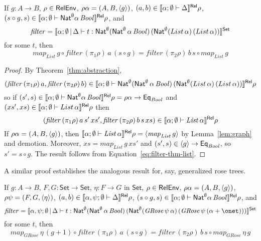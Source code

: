 \documentclass[runningheads]{llncs}
\newcommand{\set}{\mathsf{Set}}
\newcommand{\semmap}{\mathit{map}}
\newcommand{\filtype}{\Nat^\emptyset 
 (\Nat^\emptyset \, \alpha \, \mathit{Bool})\, (\Nat^\emptyset 
  (List \, \alpha) \, (List \, \alpha))}
\newcommand{\filtypeGRose}{\Nat^\emptyset 
 (\Nat^\emptyset \, \alpha \, \mathit{Bool})\, (\Nat^\emptyset 
  (\mathit{GRose}\,\psi \, \alpha) \, (\mathit{GRose}\,\psi \, (\alpha
  + \onet)))}
\begin{document}
\begin{theorem} 
If $g : A \to B$, $\rho \in \mathsf{RelEnv}$, $\rho \alpha = (A, B, \langle {g} \rangle)$,
$(a, b) \in \llbracket{\alpha ;\emptyset \vdash \Delta}\rrbracket^{\mathsf{Rel}} \rho$, $(s \circ
g, s) \in \llbracket{\alpha; \emptyset \vdash \mathsf{Nat}^\emptyset \alpha \,
  \mathit{Bool}}\rrbracket^{\mathsf{Rel}} \rho$, and
\[\mathit{filter} = \setsem{\alpha; \emptyset \,|\, \Delta \vdash t :
  \filtype}\]
\noindent
for some $t$, then
\[  \mathit{map}_{\mathit{List}} \,g \circ \mathit{filter} \, (\pi_1
\rho) \, a \, (s \circ g) = \mathit{filter}\, (\pi_2\rho) \, b \, s
\circ \mathit{map}_{\mathit{List}} \,g\]
\end{theorem}
\begin{proof}
By Theorem~\ref{thm:abstraction}, \[(\mathit{filter}\, (\pi_1 \rho)\,
a, \mathit{filter}\, (\pi_2 \rho)\, b) \in \relsem{\alpha; \emptyset
  \vdash \filtype} \rho\] so if $(s', s) \in \llbracket{\alpha; \emptyset
  \vdash \mathsf{Nat}^\emptyset \alpha \, \mathit{Bool}}\rrbracket^{\mathsf{Rel}} \rho = \rho\alpha \to
\mathsf{Eq}_{\mathit{Bool}}$ and $(xs', xs) \in \llbracket{\alpha; \emptyset
  \vdash List \, \alpha}\rrbracket^{\mathsf{Rel}} \rho$ then
\begin{equation}\label{eq:filter-thm-list}
  (\mathit{filter}\, (\pi_1\rho) \,a \,s' \,xs', \mathit{filter} \,
  (\pi_2\rho) \,b \,s \,xs) \in \llbracket{\alpha; \emptyset \vdash
    \mathit{List} \, \alpha}\rrbracket^{\mathsf{Rel}} \rho
\end{equation}
If $\rho\alpha = (A, B, \langle {g} \rangle)$, then $\llbracket{\alpha; \emptyset
  \vdash \mathit{List} \, \alpha}\rrbracket^{\mathsf{Rel}} \rho =
\langle {\mathit{map}_{\mathit{List}} \, g} \rangle$ by Lemma~\ref{lem:graph}
and demotion.  Moreover, $xs =
\mathit{map}_{\mathit{List}} \,g \,xs'$ and $(s', s) \in \langle {g} \rangle \to
\mathsf{Eq}_{\mathit{Bool}}$, so $s' = s \circ g$. The result
follows from 
Equation~\ref{eq:filter-thm-list}.\end{proof}

A similar proof establishes the analogous result for, say, generalized
rose trees. 
\begin{theorem} 
  If $g : A \to B$,
$F, G : \set \to \set$,
  $\eta : F \to G$ in $\set$, $\rho \in \mathsf{RelEnv}$, $\rho \alpha =
 (A, B, \langle {g} \rangle)$, $\rho \psi = (F, G, \langle {\eta} \rangle)$, $(a, b) \in
 \llbracket{\alpha, \psi ;\emptyset \vdash \Delta}\rrbracket^{\mathsf{Rel}} \rho$, $(s \circ
 g, s) \in \llbracket{\alpha; \emptyset \vdash \mathsf{Nat}^\emptyset \alpha \,
   \mathit{Bool}}\rrbracket^{\mathsf{Rel}} \rho$, and
 \[ \mathit{filter} = \setsem{\alpha, \psi; \emptyset \,|\, \Delta
      \vdash t : \filtypeGRose}  \]
for some $t$, then
\[ \semmap_{\mathit{GRose}}\, \eta\, (g + 1) \circ \mathit{filter} \,
(\pi_1 \rho) \, a \, (s \circ g) = \mathit{filter} \, (\pi_2\rho) \, b
\, s \circ 
\semmap_{\mathit{GRose}}\, \eta\, g\]
\end{theorem}
\end{document}
